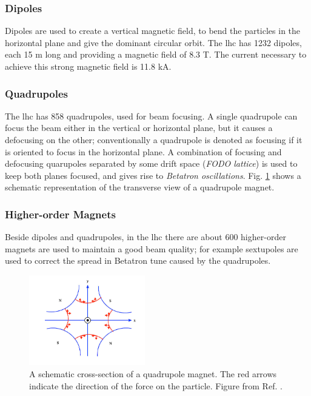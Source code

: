 \subsubsection*{Dipoles} 
Dipoles are used to create a vertical magnetic field, to bend the particles in the horizontal plane and give the dominant circular orbit. The \gls{lhc} has 1232 dipoles, each 15 m long and providing a magnetic field of 8.3 T. The current necessary to achieve this strong magnetic field is 11.8 kA.


\subsubsection*{Quadrupoles}
The \gls{lhc} has 858 quadrupoles, used for beam focusing. A single quadrupole can focus the beam either in the vertical or horizontal plane, but it causes a defocusing on the other; conventionally a quadrupole is denoted as focusing if it is oriented to focus in the horizontal plane. A combination of focusing and defocusing quarupoles separated by some drift space (\textit{FODO lattice}) is used to keep both planes focused, and gives rise to \textit{Betatron oscillations}. Fig. \ref{fig:lhc:quad} shows a schematic representation of the transverse view of a quadrupole magnet.

\subsubsection*{Higher-order Magnets} 
Beside dipoles and quadrupoles, in the \gls{lhc} there are about 600 higher-order magnets are used to maintain a good beam quality; for example sextupoles are used to correct the spread in Betatron tune caused by the quadrupoles.




\begin{figure}[ht]
\centering
\includegraphics[width=0.45\textwidth]{figures/lhc/figures_quad}
\caption{A schematic cross-section of a quadrupole magnet. The red arrows indicate the direction of the force on the particle. Figure from Ref. \cite{Kain:2016aly}.}
\label{fig:lhc:quad}
\end{figure}

